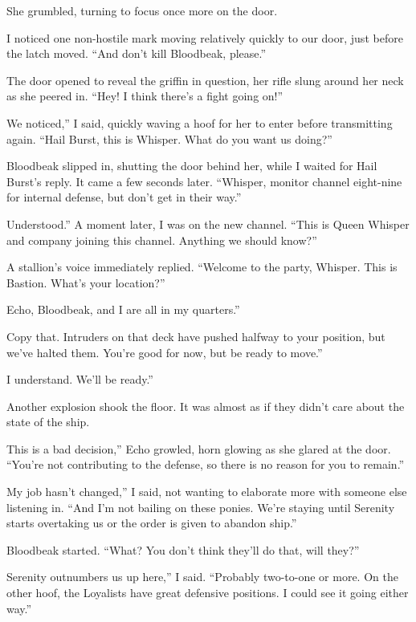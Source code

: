 She grumbled, turning to focus once more on the door.

I noticed one non-hostile mark moving relatively quickly to our door, just before the latch moved. “And don’t kill Bloodbeak, please.”

The door opened to reveal the griffin in question, her rifle slung around her neck as she peered in. “Hey! I think there’s a fight going on!”

\leavevmode{}We noticed,” I said, quickly waving a hoof for her to enter before transmitting again. “Hail Burst, this is Whisper. What do you want us doing?”

Bloodbeak slipped in, shutting the door behind her, while I waited for Hail Burst’s reply. It came a few seconds later. “Whisper, monitor channel eight-nine for internal defense, but don’t get in their way.”

\leavevmode{}Understood.” A moment later, I was on the new channel. “This is Queen Whisper and company joining this channel. Anything we should know?”

A stallion’s voice immediately replied. “Welcome to the party, Whisper. This is Bastion. What’s your location?”

\leavevmode{}Echo, Bloodbeak, and I are all in my quarters.”

\leavevmode{}Copy that. Intruders on that deck have pushed halfway to your position, but we’ve halted them. You’re good for now, but be ready to move.”

\leavevmode{}I understand. We’ll be ready.”

Another explosion shook the floor. It was almost as if they didn’t care about the state of the ship.

\leavevmode{}This is a bad decision,” Echo growled, horn glowing as she glared at the door. “You’re not contributing to the defense, so there is no reason for you to remain.”

\leavevmode{}My job hasn’t changed,” I said, not wanting to elaborate more with someone else listening in. “And I’m not bailing on these ponies. We’re staying until Serenity starts overtaking us or the order is given to abandon ship.”

Bloodbeak started. “What? You don’t think they’ll do that, will they?”

\leavevmode{}Serenity outnumbers us up here,” I said. “Probably two-to-one or more. On the other hoof, the Loyalists have great defensive positions. I could see it going either way.”


